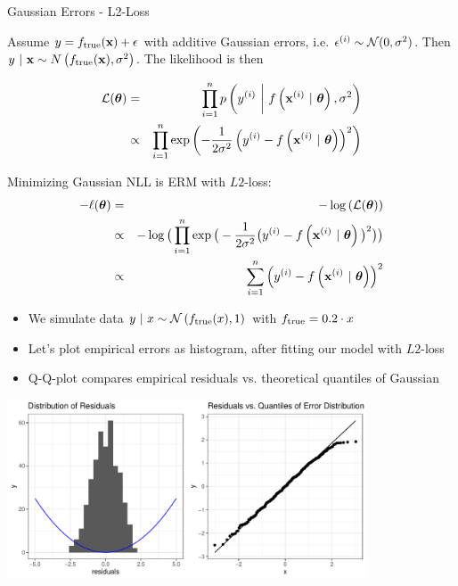 \documentclass[11pt,compress,t,notes=noshow, xcolor=table]{beamer}
\begin{document}
\begin{vbframe}{Gaussian Errors - L2-Loss} 

Assume $y = f_{\text{true}}(\mathbf{x}) + \epsilon$ with additive Gaussian errors, i.e. $\epsilon^{(i)} \sim \mathcal{N}(0, \sigma^2)$. Then $y~|~\mathbf{x} \sim N\left(f_{\text{true}}(\mathbf{x}), \sigma^2\right)$. The likelihood is then 

{\small
\begin{eqnarray*}
\mathcal{L}(\bm{\theta}) &=& \prod\limits_{i=1}^n p\left(y^{(i)} ~\bigg|~ f\left(\mathbf{x}^{(i)} ~|~ \bm{\theta}\right), \sigma^2\right) \\ &\propto& \prod\limits_{i=1}^n \exp\left(-\frac{1}{2\sigma^2} \left(y^{(i)} - f\left(\mathbf{x}^{(i)} ~|~ \bm{\theta}\right)\right)^2\right)
\end{eqnarray*}
}


Minimizing Gaussian NLL is ERM with $L2$-loss:
{\small
\begin{eqnarray*}
- \ell(\bm{\theta}) &=& - \log\left(\mathcal{L}(\bm{\theta})\right) \\
&\propto& - \log\big(\prod\limits_{i=1}^n \exp\big(-\frac{1}{2\sigma^2} \big(y^{(i)} - f\left(\mathbf{x}^{(i)} ~|~ \bm{\theta}\right)\big)^2\big)\big) \\
&\propto& \sum\limits_{i=1}^n \left(y^{(i)} - f\left(\mathbf{x}^{(i)} ~|~ \bm{\theta}\right)\right)^2
\end{eqnarray*}
}

\framebreak 

\begin{footnotesize}
\begin{itemize}
	\item We simulate data $y ~|~x \sim \mathcal{N}\left(f_{\text{true}}(x), 1\right)$ with $f_{\text{true}} = 0.2 \cdot x$ 
\item Let's plot empirical errors as histogram, after fitting our model with $L2$-loss
\item Q-Q-plot compares empirical residuals vs. theoretical quantiles of Gaussian 
\end{itemize}
\end{footnotesize}

\begin{center}
\includegraphics[width = 0.8\textwidth]{figure/residuals_plot_L2.pdf}
\end{center}
\end{vbframe}
\end{document}
